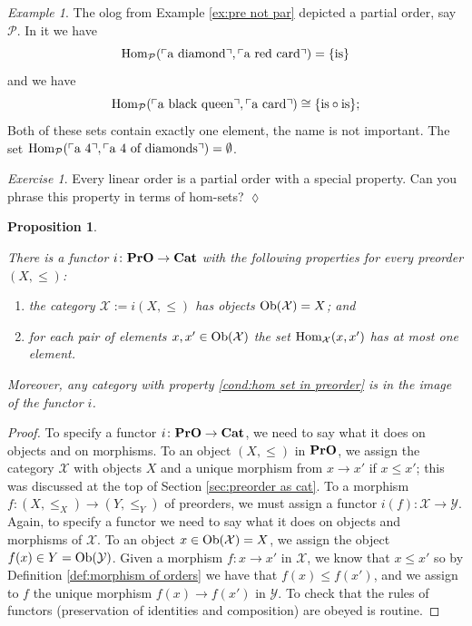 \documentclass{book}
\def\tn{\textnormal}
\def\mc{\mathcal}
\def\Hom{\tn{Hom}}
\def\Ob{\tn{Ob}}
\def\to{\rightarrow}
\def\taking{\colon}
\def\iso{\cong}
\newcommand{\fakebox}[1]{\tn{$\ulcorner$#1$\urcorner$}}
\def\Cat{{\bf Cat}}
\def\PrO{{\bf PrO}}
\def\mcP{\mc{P}}
\def\mcX{\mc{X}}
\def\mcY{\mc{Y}}
\newtheorem{proposition}[subsubsection]{Proposition}
\theoremstyle{remark}
\newtheorem{example}[subsubsection]{Example}
\newtheorem{exc}[subsubsection]{Exercise}
\newenvironment{exercise}{\begin{exc}}{\hspace*{\fill}$\lozenge$\end{exc}}
\theoremstyle{definition}
\begin{document}
\begin{example}

The olog from Example \ref{ex:pre not par} depicted a partial order, say $\mcP$. In it we have $$\Hom_\mcP(\fakebox{a diamond},\fakebox{a red card})=\{\tn{is}\}$$ and we have $$\Hom_\mcP(\fakebox{a black queen},\fakebox{a card})\iso\{\tn{is}\circ\tn{is}\};$$ Both of these sets contain exactly one element, the name is not important. The set $\Hom_\mcP(\fakebox{a 4},\fakebox{a 4 of diamonds})=\emptyset$. 

\end{example}

\begin{exercise}
Every linear order is a partial order with a special property. Can you phrase this property in terms of hom-sets?
\end{exercise}

\begin{proposition}\label{prop:preorders to cats}

There is a functor $i\taking\PrO\to\Cat$\index{a functor!$\PrO\to\Cat$} with the following properties for every preorder $(X,\leq)$:
\begin{enumerate}
\item the category $\mcX:=i(X,\leq)$ has objects $\Ob(\mcX)=X$; and
\item \label{cond:hom set in preorder} for each pair of elements $x,x'\in\Ob(\mcX)$ the set $\Hom_\mcX(x,x')$ has at most one element.
\end{enumerate}
Moreover, any category with property \ref{cond:hom set in preorder} is in the image of the functor $i$.

\end{proposition}

\begin{proof}

To specify a functor $i\taking\PrO\to\Cat$, we need to say what it does on objects and on morphisms. To an object $(X,\leq)$ in $\PrO$, we assign the category $\mcX$ with objects $X$ and a unique morphism from $x\to x'$ if $x\leq x'$; this was discussed at the top of Section \ref{sec:preorder as cat}. To a morphism $f\taking(X,\leq_X)\to(Y,\leq_Y)$ of preorders, we must assign a functor $i(f)\taking\mcX\to\mcY$. Again, to specify a functor we need to say what it does on objects and morphisms of $\mcX$. To an object $x\in\Ob(\mcX)=X$, we assign the object $f(x)\in Y=\Ob(\mcY)$. Given a morphism $f\taking x\to x'$ in $\mcX$, we know that $x\leq x'$ so by Definition \ref{def:morphism of orders} we have that $f(x)\leq f(x')$, and we assign to $f$ the unique morphism $f(x)\to f(x')$ in $\mcY$. To check that the rules of functors (preservation of identities and composition) are obeyed is routine.

\end{proof}
\end{document}
